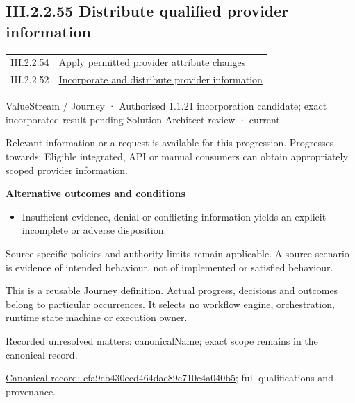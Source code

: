 \subsection*{III.2.2.55 Distribute qualified provider information}
\label{navigation:III.2.2.55}

\begin{longtable}{p{.22\linewidth}p{.73\linewidth}}
III.2.2.54 & \hyperref[element:1ceb340083984b9fbe393532c69abe72]{Apply permitted provider attribute changes} \\
III.2.2.52 & \hyperref[element:9eb9f3210d5e4b46ac21463f54e62ab9]{Incorporate and distribute provider information} \\
\end{longtable}
\label{element:cfa9cb430ecd464dae89c710c4a040b5}
{\small ValueStream / Journey · Authorised 1.1.21 incorporation candidate; exact incorporated result pending Solution Architect review · current}\par

Relevant information or a request is available for this progression. Progresses towards: Eligible integrated, API or manual consumers can obtain appropriately scoped provider information.



\par\medskip\textbf{Alternative outcomes and conditions}\par


\begin{itemize}


\item Insufficient evidence, denial or conflicting information yields an explicit incomplete or adverse disposition.

\end{itemize}


Source-specific policies and authority limits remain applicable. A source scenario is evidence of intended behaviour, not of implemented or satisfied behaviour.



This is a reusable Journey definition. Actual progress, decisions and outcomes belong to particular occurrences. It selects no workflow engine, orchestration, runtime state machine or execution owner.


{\small Recorded unresolved matters: canonicalName; exact scope remains in the canonical record.}\par
{\footnotesize \href{../../../../continuum/strategy/value-stream/cfa9cb430ecd464dae89c710c4a040b5.md}{Canonical record: cfa9cb430ecd464dae89c710c4a040b5}; full qualifications and provenance.}\par
